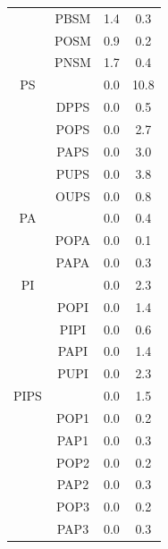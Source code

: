 \documentclass[preprint,3p,9pt,times,onecolumn]{elsarticle}
\begin{document}
\begin{table}
\begin{tabular}{|c||c|cc|}
{} &PBSM                         & 1.4      & 0.3                           \\
{} &POSM                         & 0.9      & 0.2                           \\
{} &PNSM                         & 1.7     & 0.4                           \\
\hline
\hline
PS &{} &0.0&10.8\\ \hline
{} &DPPS                         & 0.0      & 0.5                           \\
{} &POPS                         & 0.0      & 2.7                           \\
{} &PAPS                         & 0.0      & 3.0                           \\
{} &PUPS                         & 0.0      & 3.8   			\\      
{} &OUPS                         & 0.0      & 0.8                           \\
\hline       
\hline          
PA &{} &0.0&0.4\\ \hline
{} &POPA                         & 0.0      & 0.1                          \\
{} &PAPA                         & 0.0      & 0.3                           \\
\hline
\hline
PI &{} &0.0&2.3\\ \hline
{} &POPI                         & 0.0      & 1.4                         \\
{} &PIPI                         & 0.0      & 0.6                           \\
{} &PAPI                         & 0.0      & 1.4                           \\
{} &PUPI                         & 0.0      & 2.3                           \\
\hline
\hline
PIPS &{} &0.0&1.5\\ \hline
{} &POP1                         & 0.0      & 0.2                           \\
{} &PAP1                         & 0.0      & 0.3                           \\
{} &POP2                         & 0.0      & 0.2                           \\
{} &PAP2                         & 0.0      & 0.3                           \\
{} &POP3                         & 0.0      & 0.2                           \\
{} &PAP3                         & 0.0      & 0.3                           \\
\hline
\end{tabular}
\end{table}
\end{document}
